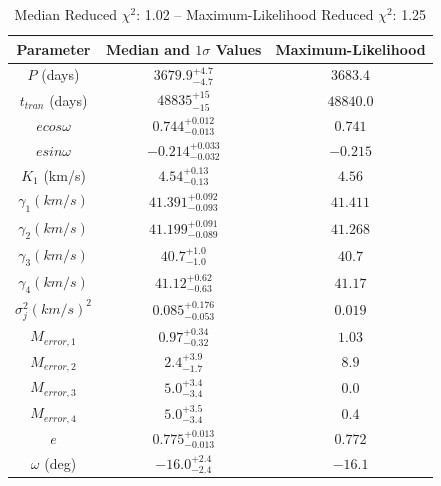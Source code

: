 \documentclass{article}
\begin{document}
\begin{table}
\centering
\caption{Median Reduced $\chi^2$: 1.02 -- Maximum-Likelihood Reduced $\chi^2$: 1.25}
\begin{tabular}{| c | c | c |}
\hline
Parameter & Median and $1 \sigma$ Values & Maximum-Likelihood \\
\hline
$P$ (days) & $3679.9^{+4.7}_{-4.7}$ & $3683.4$ \\
\hline
$t_{tran}$ (days) & $48835^{+15}_{-15}$ & $48840.0$ \\
\hline
$e cos\omega$ & $0.744^{+0.012}_{-0.013}$ & $0.741$ \\
\hline
$e sin\omega$ & $-0.214^{+0.033}_{-0.032}$ & $-0.215$ \\
\hline
$K_1$ (km/s) & $4.54^{+0.13}_{-0.13}$ & $4.56$ \\
\hline
$\gamma_{1} (km/s)$ & $41.391^{+0.092}_{-0.093}$ & $41.411$ \\
\hline
$\gamma_{2} (km/s)$ & $41.199^{+0.091}_{-0.089}$ & $41.268$ \\
\hline
$\gamma_{3} (km/s)$ & $40.7^{+1.0}_{-1.0}$ & $40.7$ \\
\hline
$\gamma_{4} (km/s)$ & $41.12^{+0.62}_{-0.63}$ & $41.17$ \\
\hline
$\sigma^2_{j} (km/s)^2$ & $0.085^{+0.176}_{-0.053}$ & $0.019$ \\
\hline
$M_{error, 1} $ & $0.97^{+0.34}_{-0.32}$ & $1.03$ \\
\hline
$M_{error, 2} $ & $2.4^{+3.9}_{-1.7}$ & $8.9$ \\
\hline
$M_{error, 3} $ & $5.0^{+3.4}_{-3.4}$ & $0.0$ \\
\hline
$M_{error, 4} $ & $5.0^{+3.5}_{-3.4}$ & $0.4$ \\
\hline
$e$ & $0.775^{+0.013}_{-0.013}$ & $0.772$ \\
\hline
$\omega$ (deg) & $-16.0^{+2.4}_{-2.4}$ & $-16.1$ \\
\hline
\end{tabular}
\end{table}

\clearpage
\end{document}

